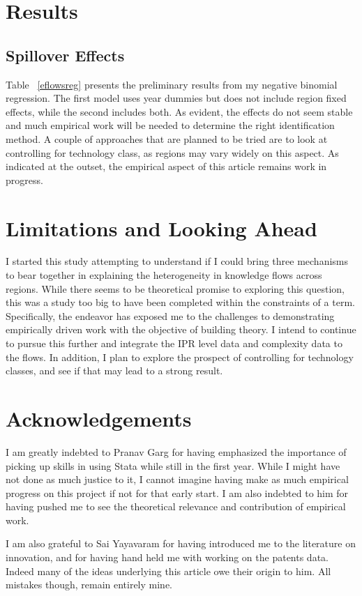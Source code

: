 \documentclass[12pt]{article}
\begin{document}
\section{Results}
\subsection{Spillover Effects}
Table ~\ref{eflowsreg} presents the preliminary results from my negative binomial regression. The first model uses year dummies but does not include region fixed effects, while the second includes both. As evident, the effects do not seem stable and much empirical work will be needed to determine the right identification method. A couple of approaches that are planned to be tried are to look at controlling for technology class, as regions may vary widely on this aspect. As indicated at the outset, the empirical aspect of this article remains work in progress.

\section{Limitations and Looking Ahead}
I started this study attempting to understand if I could bring three mechanisms to bear together in explaining the heterogeneity in knowledge flows across regions. While there seems to be theoretical promise to exploring this question, this was a study too big to have been completed within the constraints of a term. Specifically, the endeavor has exposed me to the challenges to demonstrating empirically driven work with the objective of building theory. I intend to continue to pursue this further and integrate the IPR level data and complexity data to the flows. In addition, I plan to explore the prospect of controlling for technology classes, and see if that may lead to a strong result.  

\section{Acknowledgements}
I am greatly indebted to Pranav Garg for having emphasized the importance of picking up skills in using Stata while still in the first year. While I might have not done as much justice to it, I cannot imagine having make as much empirical progress on this project if not for that early start. I am also indebted to him for having pushed me to see the theoretical relevance and contribution of empirical work.

I am also grateful to Sai Yayavaram for having introduced me to the literature on innovation, and for having hand held me with working on the patents data. Indeed many of the ideas underlying this article owe their origin to him. All mistakes though, remain entirely mine.
\end{document}
